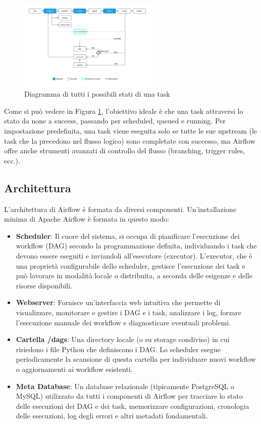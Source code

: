 \begin{figure}[h]
    \centering
    \includegraphics[width=0.6\textwidth]{img/task_lifecycle_diagram.png}
    \caption{Diagramma di tutti i possibili stati di una task}
    \label{fig:task_lifecycle}
\end{figure}

Come si può vedere in Figura \ref{fig:task_lifecycle}, l'obiettivo ideale è che una task attraversi lo stato da none a success, passando per scheduled, queued e running. Per impostazione predefinita, una task viene eseguita solo se tutte le sue upstream (le task che la precedono nel flusso logico) sono completate con successo, ma Airflow offre anche strumenti avanzati di controllo del flusso (branching, trigger rules, ecc.).


\subsection{Architettura}
\label{sec:architettura}
L'architettura di Airflow è formata da diversi componenti. Un'installazione minima di Apache Airflow è formata in questo modo: 

\begin{itemize}
    \item \textbf{Scheduler}: Il cuore del sistema, si occupa di pianificare l'esecuzione dei workflow (DAG) secondo la programmazione definita, individuando i task che devono essere eseguiti e inviandoli all'esecutore (executor). L'executor, che è una proprietà configurabile dello scheduler, gestisce l'esecuzione dei task e può lavorare in modalità locale o distribuita, a seconda delle esigenze e delle risorse disponibili.
    \item \textbf{Webserver}: Fornisce un'interfaccia web intuitiva che permette di visualizzare, monitorare e gestire i DAG e i task, analizzare i log, forzare l'esecuzione manuale dei workflow e diagnosticare eventuali problemi.
    \item \textbf{Cartella /dags}: Una directory locale (o su storage condiviso) in cui risiedono i file Python che definiscono i DAG. Lo scheduler esegue periodicamente la scansione di questa cartella per individuare nuovi workflow o aggiornamenti ai workflow esistenti.
    \item \textbf{Meta Database}: Un database relazionale (tipicamente PostgreSQL o MySQL) utilizzato da tutti i componenti di Airflow per tracciare lo stato delle esecuzioni dei DAG e dei task, memorizzare configurazioni, cronologia delle esecuzioni, log degli errori e altri metadati fondamentali.
\end{itemize}

